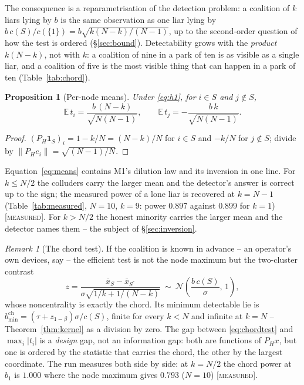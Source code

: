 \documentclass[10pt,twocolumn,a4paper]{article}
\newcommand{\measured}{\textcolor{blue!70!black}{\textsc{[measured]}}}
\newtheorem{proposition}[theorem]{Proposition}
\theoremstyle{definition}
\theoremstyle{remark}
\newtheorem{remark}[theorem]{Remark}
\newcommand{\PH}{P_{H}}
\newcommand{\one}{\mathbf{1}}
\newcommand{\bmin}{b_{\min}}
\newcommand{\taur}{\tau}
\begin{document}
The consequence is a reparametrisation of the detection problem: a coalition of
$k$ liars lying by $b$ is the same observation as one liar lying by
$b\,c(S)/c(\{1\})=b\sqrt{k(N-k)/(N-1)}$, up to the second-order question of how
the test is ordered (\S\ref{sec:bound}). Detectability grows with the
\emph{product} $k(N-k)$, not with $k$: a coalition of nine in a park of ten is as
visible as a single liar, and a coalition of five is the most visible thing that
can happen in a park of ten (Table~\ref{tab:chord}).

\begin{proposition}[Per-node means]
\label{prop:means}
Under \eqref{eq:h1}, for $i\in S$ and $j\notin S$,
\begin{equation}
\mathbb E\,t_i=\frac{b\,(N-k)}{\sqrt{N(N-1)}},\qquad
\mathbb E\,t_j=-\frac{b\,k}{\sqrt{N(N-1)}} .
\label{eq:means}
\end{equation}
\end{proposition}

\begin{proof}
$(\PH\one_S)_i=1-k/N=(N-k)/N$ for $i\in S$ and $-k/N$ for $j\notin S$; divide by
$\|\PH e_i\|=\sqrt{(N-1)/N}$.
\end{proof}

Equation~\eqref{eq:means} contains M1's dilution law and its inversion in one
line. For $k\le N/2$ the colluders carry the larger mean and the detector's
answer is correct up to the sign; the measured power of a lone liar is recovered
at $k=N-1$ (Table~\ref{tab:measured}, $N=10$, $k=9$: power $0.897$ against
$0.899$ for $k=1$) \measured. For $k>N/2$ the honest minority carries the larger
mean and the detector names them -- the subject of \S\ref{sec:inversion}.



\begin{remark}[The chord test]
\label{rem:chordtest}
If the coalition is known in advance -- an operator's own devices, say -- the
efficient test is not the node maximum but the two-cluster contrast
\begin{equation}
z=\frac{\bar x_S-\bar x_{S^c}}{\sigma\sqrt{1/k+1/(N-k)}}
\ \sim\ \mathcal N\!\left(\frac{b\,c(S)}{\sigma},\,1\right),
\label{eq:chordtest}
\end{equation}
whose noncentrality is exactly the chord. Its minimum detectable lie is
$\bmin^{\mathrm{ch}}=({\taur}+z_{1-\beta})\sigma/c(S)$, finite for every $k<N$
and infinite at $k=N$ -- Theorem~\ref{thm:kernel} as a division by zero. The gap
between \eqref{eq:chordtest} and $\max_i|t_i|$ is a \emph{design} gap, not an
information gap: both are functions of $\PH x$, but one is ordered by the
statistic that carries the chord, the other by the largest coordinate. The run
measures both side by side: at $k=N/2$ the chord power at $b_1$ is $1.000$ where
the node maximum gives $0.793$ ($N=10$) \measured.
\end{remark}
\end{document}
